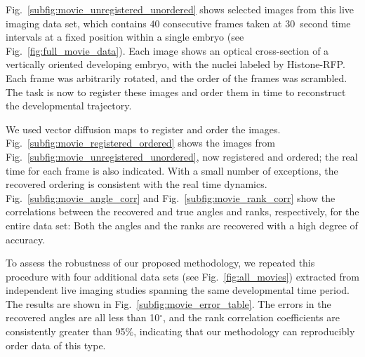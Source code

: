 \documentclass[twocolumn, 10pt]{article}
\newcommand{\fig}[0]{Fig.}
\begin{document}
\fig~\ref{subfig:movie_unregistered_unordered} shows selected images from this live imaging data set, which contains $40$ consecutive frames taken at $30$~second time intervals at a fixed position within a single embryo (see \fig~\ref{fig:full_movie_data}).
%
Each image shows an optical cross-section of a vertically oriented developing embryo, with the nuclei labeled by Histone-RFP.
%
Each frame was arbitrarily rotated, and the order of the frames was scrambled.
%
The task is now to register these images and order them in time to reconstruct the developmental trajectory.

We used vector diffusion maps to register and order the images. 
%
\fig~\ref{subfig:movie_registered_ordered} shows the images from \fig~\ref{subfig:movie_unregistered_unordered}, now registered and ordered; the real time for each frame is also indicated.
%
With a small number of exceptions, the recovered ordering is consistent with the real time dynamics. 
%
\fig~\ref{subfig:movie_angle_corr} and \fig~\ref{subfig:movie_rank_corr}  show the correlations between the recovered and true angles and ranks, respectively, for the entire data set: 
%
Both the angles and the ranks are recovered with a high degree of accuracy.

To assess the robustness of our proposed methodology, we repeated this procedure with four additional data sets (see \fig~\ref{fig:all_movies}) extracted from independent live imaging studies spanning the same developmental time period. 
%
The results are shown in \fig~\ref{subfig:movie_error_table}. 
%
The errors in the recovered angles are all less than 10$^\circ$, and the rank correlation coefficients are consistently greater than 95\%, indicating that our methodology can reproducibly order data of this type. 
\end{document}
